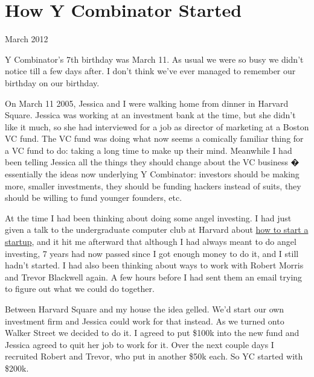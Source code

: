 \chapter{How Y Combinator Started}


            
              
                

March 2012

Y Combinator's 7th birthday was March
                  11. As usual we were so busy we didn't notice till a few days
                  after. I don't think we've ever managed to remember our
                  birthday on our birthday.
                  
                    On March 11 2005, Jessica and I were walking home from
                    dinner in Harvard Square. Jessica was working at an
                    investment bank at the time, but she didn't like it much, so
                    she had interviewed for a job as director of marketing at a
                    Boston VC fund. The VC fund was doing what now seems a
                    comically familiar thing for a VC fund to do: taking a long
                    time to make up their mind. Meanwhile I had been telling
                    Jessica all the things they should change about the VC
                    business � essentially the ideas now underlying
                    Y Combinator: investors should be making more, smaller
                    investments, they should be funding hackers instead of
                    suits, they should be willing to fund younger founders, etc.
                  


                  
                    At the time I had been thinking about doing some angel
                    investing. I had just given a talk to the undergraduate
                    computer club at Harvard about
                    \href{http://www.paulgraham.com/start.html}{how to start a startup}, and it hit me afterward that although I had always meant
                    to do angel investing, 7 years had now passed since I got
                    enough money to do it, and I still hadn't started. I had
                    also been thinking about ways to work with Robert Morris and
                    Trevor Blackwell again. A few hours before I had sent them
                    an email trying to figure out what we could do together.
                  


                  
                    Between Harvard Square and my house the idea gelled. We'd
                    start our own investment firm and Jessica could work for
                    that instead. As we turned onto Walker Street we decided to
                    do it. I agreed to put \$100k into the new fund and Jessica
                    agreed to quit her job to work for it. Over the next couple
                    days I recruited Robert and Trevor, who put in another \$50k
                    each. So YC started with \$200k.
                  


